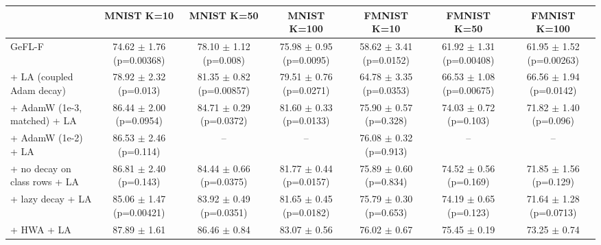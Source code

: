 \begin{tabular}{lcccccc}
\toprule
 & MNIST K=10 & MNIST K=50 & MNIST K=100 & FMNIST K=10 & FMNIST K=50 & FMNIST K=100 \\
\midrule
GeFL-F & 74.62 $\pm$ 1.76 (p=0.00368) & 78.10 $\pm$ 1.12 (p=0.008) & 75.98 $\pm$ 0.95 (p=0.0095) & 58.62 $\pm$ 3.41 (p=0.0152) & 61.92 $\pm$ 1.31 (p=0.00408) & 61.95 $\pm$ 1.52 (p=0.00263) \\
+ LA (coupled Adam decay) & 78.92 $\pm$ 2.32 (p=0.013) & 81.35 $\pm$ 0.82 (p=0.00857) & 79.51 $\pm$ 0.76 (p=0.0271) & 64.78 $\pm$ 3.35 (p=0.0353) & 66.53 $\pm$ 1.08 (p=0.00675) & 66.56 $\pm$ 1.94 (p=0.0142) \\
+ AdamW (1e-3, matched) + LA & 86.44 $\pm$ 2.00 (p=0.0954) & 84.71 $\pm$ 0.29 (p=0.0372) & 81.60 $\pm$ 0.33 (p=0.0133) & 75.90 $\pm$ 0.57 (p=0.328) & 74.03 $\pm$ 0.72 (p=0.103) & 71.82 $\pm$ 1.40 (p=0.096) \\
+ AdamW (1e-2) + LA & 86.53 $\pm$ 2.46 (p=0.114) & -- & -- & 76.08 $\pm$ 0.32 (p=0.913) & -- & -- \\
+ no decay on class rows + LA & 86.81 $\pm$ 2.40 (p=0.143) & 84.44 $\pm$ 0.66 (p=0.0375) & 81.77 $\pm$ 0.44 (p=0.0157) & 75.89 $\pm$ 0.60 (p=0.834) & 74.52 $\pm$ 0.56 (p=0.169) & 71.85 $\pm$ 1.56 (p=0.129) \\
+ lazy decay + LA & 85.06 $\pm$ 1.47 (p=0.00421) & 83.92 $\pm$ 0.49 (p=0.0351) & 81.65 $\pm$ 0.45 (p=0.0182) & 75.79 $\pm$ 0.30 (p=0.653) & 74.19 $\pm$ 0.65 (p=0.123) & 71.64 $\pm$ 1.28 (p=0.0713) \\
+ HWA + LA & 87.89 $\pm$ 1.61 & 86.46 $\pm$ 0.84 & 83.07 $\pm$ 0.56 & 76.02 $\pm$ 0.67 & 75.45 $\pm$ 0.19 & 73.25 $\pm$ 0.74 \\
\bottomrule
\end{tabular}
